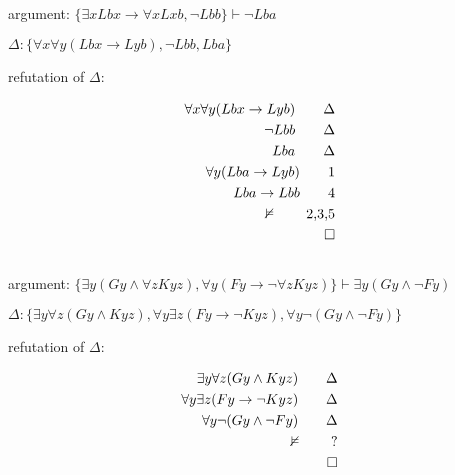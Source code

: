 \documentclass[a4paper,11pt]{article}
\begin{document}

\subsection{}

argument: $\{ \exists x Lbx \rightarrow \forall x Lxb, \lnot Lbb \} \vdash \lnot Lba $

\bigskip

\noindent $\Delta: \{ \forall x \forall y(Lbx \rightarrow Lyb),  \lnot Lbb, Lba \}$

\bigskip

\noindent refutation of $\Delta:$

\begin{align*} 
  \forall x \forall y(Lbx \rightarrow Lyb)        						\tag*{$\Delta$} \\
  \lnot Lbb												\tag*{$\Delta$} \\
  Lba								  		                		\tag*{$\Delta$} \\
  \forall y(Lba \rightarrow Lyb)								\tag*{1} \\
  Lba \rightarrow Lbb										\tag*{4} \\
  \nvDash												\tag*{2,3,5} \\
  \qedhere
\end{align*}


\subsection{}

argument: $\{ \exists y(Gy \land \forall z Kyz), \forall y(Fy \rightarrow \lnot \forall z Kyz) \} \vdash \exists y(Gy \land \lnot Fy) $

\bigskip

\noindent $\Delta: \{ \exists y \forall z(Gy \land Kyz), \forall y \exists z(Fy \rightarrow \lnot Kyz), \forall y \lnot(Gy \land \lnot Fy) \} $

\bigskip

\noindent refutation of $\Delta:$

\begin{align*} 
  \exists y \forall z(Gy \land Kyz)         						\tag*{$\Delta$} \\
  \forall y \exists z(Fy \rightarrow \lnot Kyz)						\tag*{$\Delta$} \\
  \forall y \lnot(Gy \land \lnot Fy)								\tag*{$\Delta$} \\
  \nvDash												\tag*{?} \\
  \qedhere
\end{align*}
\end{document}
